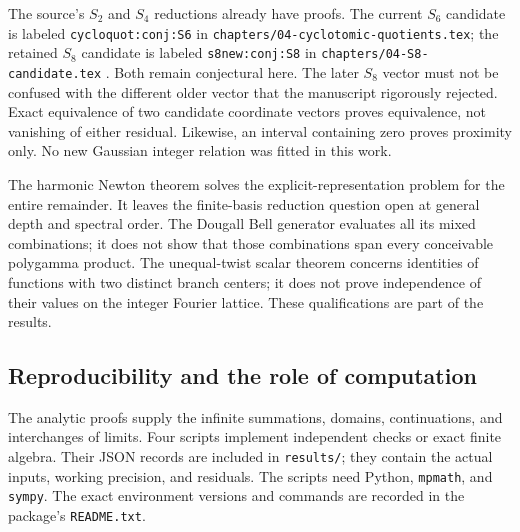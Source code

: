 \documentclass[11pt,a4paper]{article}
\numberwithin{equation}{section}
\theoremstyle{definition}
\theoremstyle{remark}
\newcommand{\src}[1]{\nolinkurl{#1}}
\begin{document}
The source's $S_2$ and $S_4$ reductions already have proofs.
The current $S_6$ candidate is labeled
\src{cycloquot:conj:S6} in
\src{chapters/04-cyclotomic-quotients.tex}; the retained $S_8$
candidate is labeled \src{s8new:conj:S8} in
\src{chapters/04-S8-candidate.tex} \cite{RepoMain}.
Both remain conjectural here. The later $S_8$ vector must not
be confused with the different older vector that the manuscript
rigorously rejected. Exact equivalence of two candidate coordinate
vectors proves equivalence, not vanishing of either residual.
Likewise, an interval containing zero proves proximity only.
No new Gaussian integer relation was fitted in this work.

The harmonic Newton theorem solves the explicit-representation
problem for the entire remainder. It leaves the finite-basis
reduction question open at general depth and spectral order.
The Dougall Bell generator evaluates all its mixed combinations;
it does not show that those combinations span every conceivable
polygamma product. The unequal-twist scalar theorem concerns
identities of functions with two distinct branch centers;
it does not prove independence of their values on the integer
Fourier lattice. These qualifications are part of the results.

\subsection{Reproducibility and the role of computation}

The analytic proofs supply the infinite summations, domains,
continuations, and interchanges of limits. Four scripts implement
independent checks or exact finite algebra. Their JSON records
are included in \src{results/}; they contain the actual inputs,
working precision, and residuals. The scripts need Python,
\src{mpmath}, and \src{sympy}. The exact environment versions
and commands are recorded in the package's \src{README.txt}.
\end{document}
